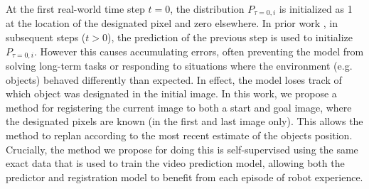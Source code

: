 At the first real-world time step $t=0$, the distribution $P_{\tau=0,i}$ is initialized as 1 at the location of the designated pixel and zero elsewhere. In prior work \cite{sna, foresight}, in subsequent steps ($t > 0$),  the prediction of the previous step is used to initialize $P_{\tau=0,i}$. However this causes accumulating errors, often preventing the model from solving long-term tasks or responding to situations where the environment (e.g. objects) behaved differently than expected. In effect, the model loses track of which object was designated in the initial image. In this work, we propose a method for registering the current image to both a start and goal image, where the designated pixels are known (in the first and last image only). This allows the method to replan according to the most recent estimate of the objects position. Crucially, the method we propose for doing this is self-supervised using the same exact data that is used to train the video prediction model, allowing both the predictor and registration model to benefit from each episode of robot experience.




